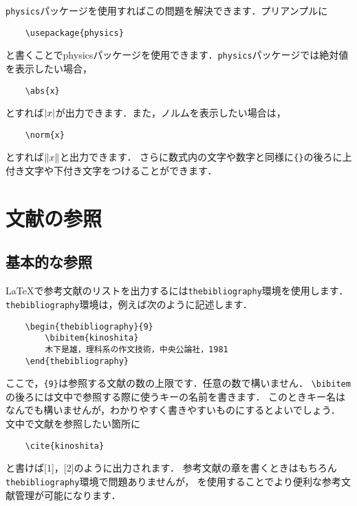 \documentclass[a4paper,11pt,titlepage]{jsarticle}
\numberwithin{equation}{section}
\theoremstyle{definition}
\begin{document}
\verb|physics|パッケージを使用すればこの問題を解決できます．プリアンプルに
\begin{verbatim}
    \usepackage{physics}
\end{verbatim}
と書くことでphysicsパッケージを使用できます．\verb|physics|パッケージでは絶対値を表示したい場合，
\begin{verbatim}
    \abs{x}
\end{verbatim}
とすれば$\abs{x}$が出力できます．また，ノルムを表示したい場合は，
\begin{verbatim}
    \norm{x}
\end{verbatim}
とすれば$\norm{x}$と出力できます．
さらに数式内の文字や数字と同様に\verb|{}|の後ろに上付き文字や下付き文字をつけることができます．


\newpage

\section{文献の参照}

\subsection{基本的な参照}

\LaTeX で参考文献のリストを出力するには\verb|thebibliography|環境を使用します\cite{bibunsyo}．
\verb|thebibliography|環境は，例えば次のように記述します．
\begin{verbatim}
    \begin{thebibliography}{9}
        \bibitem{kinoshita}
        木下是雄，理科系の作文技術，中央公論社，1981
    \end{thebibliography}
\end{verbatim}
ここで，\verb|{9}|は参照する文献の数の上限です．任意の数で構いません．
\verb|\bibitem|の後ろには文中で参照する際に使うキーの名前を書きます．
このときキー名はなんでも構いませんが，わかりやすく書きやすいものにするとよいでしょう．
文中で文献を参照したい箇所に
\begin{verbatim}
    \cite{kinoshita}
\end{verbatim}
と書けば[1]，[2]のように出力されます．
参考文献の章を書くときはもちろん\verb|thebibliography|環境で問題ありませんが，
\BibTeX を使用することでより便利な参考文献管理が可能になります．

\subsection{\BibTeX}

\newpage



\end{document}
